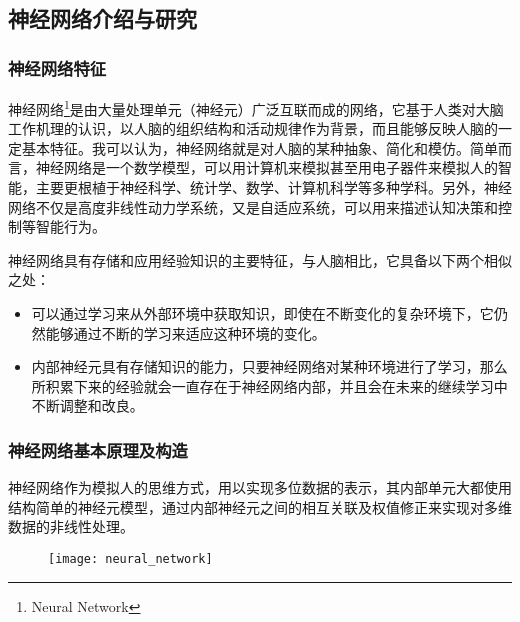 \subsection{神经网络介绍与研究}
\subsubsection{神经网络特征}
神经网络\footnote{Neural Network}是由大量处理单元（神经元）广泛互联而成的网络，它基于人类对大脑工作机理的认识，以人脑的组织结构和活动规律作为背景，而且能够反映人脑的一定基本特征。我可以认为，神经网络就是对人脑的某种抽象、简化和模仿。简单而言，神经网络是一个数学模型，可以用计算机来模拟甚至用电子器件来模拟人的智能，主要更根植于神经科学、统计学、数学、计算机科学等多种学科。另外，神经网络不仅是高度非线性动力学系统，又是自适应系统，可以用来描述认知决策和控制等智能行为。

神经网络具有存储和应用经验知识的主要特征，与人脑相比，它具备以下两个相似之处：
\begin{itemize}[noitemsep,topsep=0pt,parsep=0pt,partopsep=0pt]
	\item 可以通过学习来从外部环境中获取知识，即使在不断变化的复杂环境下，它仍然能够通过不断的学习来适应这种环境的变化。
	\item 内部神经元具有存储知识的能力，只要神经网络对某种环境进行了学习，那么所积累下来的经验就会一直存在于神经网络内部，并且会在未来的继续学习中不断调整和改良。
\end{itemize}

\subsubsection{神经网络基本原理及构造}
神经网络作为模拟人的思维方式，用以实现多位数据的表示，其内部单元大都使用结构简单的神经元模型，通过内部神经元之间的相互关联及权值修正来实现对多维数据的非线性处理。

\begin{figure}[!hbp]
  \centering
  \begin{minipage}[b]{0.6\textwidth}
    \captionstyle{\centering}
    \centering
    \texttt{[image: neural\_network]}
  \end{minipage}     
\end{figure}

